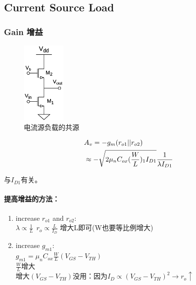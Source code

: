 \documentclass[twoside,a4paper,openright,titlepage,draft]{ctexrep}
\begin{document}
\subsection{Current Source Load\\}
\subsubsection{Gain 增益}
\begin{multicols}{2}
    \begin{figure}[H]
        \centering
        \includegraphics[height=40mm]{currentsourceload.eps}
        \caption{电流源负载的共源}
        \label{fig:电流源负载的共源}
    \end{figure}
    \columnbreak

    \begin{align}
        &A_v = -g_m(r_{o1}||r_{o2}) \notag \\
        &\approx -\sqrt{2\mu_nC_{ox}(\frac{W}{L})_1I_{D1}}\frac{1}{\lambda I_{D1}}
    \end{align}
    \begin{center}
        与$I_{D1}$有关。
    \end{center}
\end{multicols}
\paragraph{提高增益的方法：}
\begin{enumerate}
    \item increase $r_{o1}$ and $r_{o2}$: \\
        $\lambda \propto \frac{1}{L}\ \ r_o\propto\frac{L}{I_D}$ 增大L即可(W也要等比例增大)
    \item increase $g_{m1}$: \\
        $g_{m1} = \mu_nC_{ox}\frac{W}{L}(V_{GS} - V_{TH})$ \\
        $\frac{W}{L}$增大 \\
        增大$(V_{GS} - V_{TH})$没用：因为$I_D\propto(V_{GS} - V_{TH})^2\rightarrow r_o\uparrow$
\end{enumerate}
\end{document}
